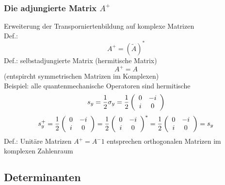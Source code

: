 \documentclass{article}
\begin{document}
\subsubsection{Die adjungierte Matrix $A^+$}
Erweiterung der Transporniertenbildung auf komplexe Matrizen\\
Def.:
\begin{equation*}
    A^+ = (\tilde{A})^*
\end{equation*}
Def.: selbstadjungierte Matrix (hermitische Matrix)
\begin{equation*}
    A^+ = A
\end{equation*}
(entspircht symmetrischen Matrizen im Komplexen)\\
Beispiel: alle quantenmechanische Operatoren sind hermitische
\begin{equation*}
    s_y = \frac{1}{2}\sigma_y = \frac{1}{2}\left(\begin{array}{c c}
        0&-i\\i&0
    \end{array}\right)
\end{equation*}
\begin{equation*}
    s_y^+ = \frac{1}{2}\left(\begin{array}{c c}0&-i\\i&0\end{array}\right) = \frac{1}{2}\left(\begin{array}{c c}0&-i\\i&0\end{array}\right)^* = \frac{1}{2}\left(\begin{array}{c c}0&-i\\i&0\end{array}\right) = s_y
\end{equation*}
Def.: Unitäre Matrizen $A^+ = A^-1$ entsprechen orthogonalen Matrizen im komplexen Zahlenraum
\subsection{Determinanten}
\end{document}
